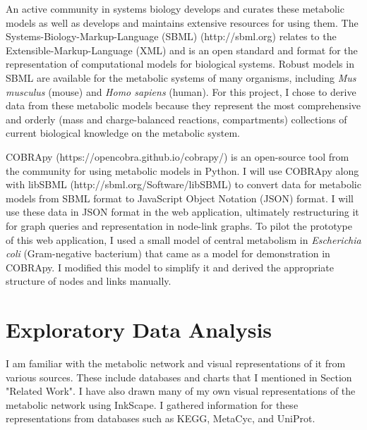 An active community in systems biology develops and curates these metabolic models as well as develops and maintains extensive resources for using them.
The Systems-Biology-Markup-Language (SBML) (http://sbml.org) relates to the Extensible-Markup-Language (XML) and is an open standard and format for the representation of computational models for biological systems.
Robust models in SBML are available for the metabolic systems of many organisms, including \textit{Mus musculus} (mouse) and \textit{Homo sapiens} (human).
For this project, I chose to derive data from these metabolic models because they represent the most comprehensive and orderly (mass and charge-balanced reactions, compartments) collections of current biological knowledge on the metabolic system.

COBRApy (https://opencobra.github.io/cobrapy/) \supercite{ebrahim_cobrapy:_2013} is an open-source tool from the community for using metabolic models in Python.
I will use COBRApy along with libSBML (http://sbml.org/Software/libSBML) \supercite{bornstein_libsbml:_2008} to convert data for metabolic models from SBML format to JavaScript Object Notation (JSON) format.
I will use these data in JSON format in the web application, ultimately restructuring it for graph queries and representation in node-link graphs.
To pilot the prototype of this web application, I used a small model of central metabolism in \textit{Escherichia coli} (Gram-negative bacterium) that came as a model for demonstration in COBRApy.
I modified this model to simplify it and derived the appropriate structure of nodes and links manually.

\section{Exploratory Data Analysis}



I am familiar with the metabolic network and visual representations of it from various sources.
These include databases and charts that I mentioned in Section "Related Work".
I have also drawn many of my own visual representations of the metabolic network using InkScape.
I gathered information for these representations from databases such as KEGG, MetaCyc, and UniProt.

